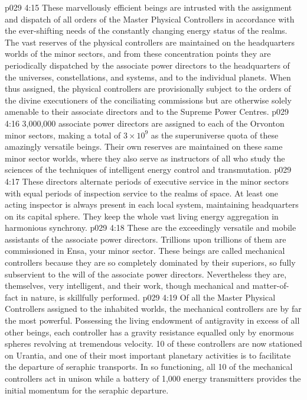 \vs p029 4:15 \bibnobreakspace {} These marvellously efficient beings are intrusted with the assignment and dispatch of all orders of the Master Physical Controllers in accordance with the ever\hyp{}shifting needs of the constantly changing energy status of the realms. The vast reserves of the physical controllers are maintained on the headquarters worlds of the minor sectors, and from these concentration points they are periodically dispatched by the associate power directors to the headquarters of the universes, constellations, and systems, and to the individual planets. When thus assigned, the physical controllers are provisionally subject to the orders of the divine executioners of the conciliating commissions but are otherwise solely amenable to their associate directors and to the Supreme Power Centres.
\vs p029 4:16 3,000,000 associate power directors are assigned to each of the Orvonton minor sectors, making a total of $3 \times 10^9$ as the superuniverse quota of these amazingly versatile beings. Their own reserves are maintained on these same minor sector worlds, where they also serve as instructors of all who study the sciences of the techniques of intelligent energy control and transmutation.
\vs p029 4:17 These directors alternate periods of executive service in the minor sectors with equal periods of inspection service to the realms of space. At least one acting inspector is always present in each local system, maintaining headquarters on its capital sphere. They keep the whole vast living energy aggregation in harmonious synchrony.
\vs p029 4:18 \bibnobreakspace {} These are the exceedingly versatile and mobile assistants of the associate power directors. Trillions upon trillions of them are commissioned in Ensa, your minor sector. These beings are called mechanical controllers because they are so completely dominated by their superiors, so fully subservient to the will of the associate power directors. Nevertheless they are, themselves, very intelligent, and their work, though mechanical and matter\hyp{}of\hyp{}fact in nature, is skillfully performed.
\vs p029 4:19 Of all the Master Physical Controllers assigned to the inhabited worlds, the mechanical controllers are by far the most powerful. Possessing the living endowment of antigravity in excess of all other beings, each controller has a gravity resistance equalled only by enormous spheres revolving at tremendous velocity. 10 of these controllers are now stationed on Urantia, and one of their most important planetary activities is to facilitate the departure of seraphic transports. In so functioning, all 10 of the mechanical controllers act in unison while a battery of 1,000 energy transmitters provides the initial momentum for the seraphic departure.
